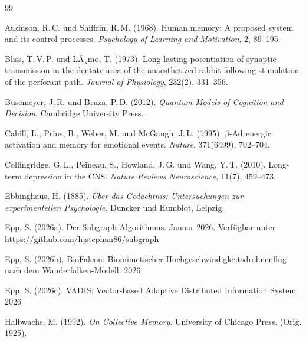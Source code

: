 ﻿\documentclass[12pt,a4paper,twoside]{article}
\theoremstyle{theormstyle}
\theoremstyle{proofstyle}
\begin{document}
	\begin{thebibliography}{99}
		
		Atkinson, R.\,C. und Shiffrin, R.\,M. (1968).
		Human memory: A proposed system and its control processes.
		\textit{Psychology of Learning and Motivation}, 2, 89--195.
		
		Bliss, T.\,V.\,P. und LÃ¸mo, T. (1973).
		Long-lasting potentiation of synaptic transmission in the
		dentate area of the anaesthetized rabbit following stimulation
		of the perforant path.
		\textit{Journal of Physiology}, 232(2), 331--356.
		
		Busemeyer, J.\,R. und Bruza, P.\,D. (2012).
		\textit{Quantum Models of Cognition and Decision}.
		Cambridge University Press.
		
		Cahill, L., Prins, B., Weber, M. und McGaugh, J.\,L. (1995).
		$\beta$-Adrenergic activation and memory for emotional events.
		\textit{Nature}, 371(6499), 702--704.
		
		Collingridge, G.\,L., Peineau, S., Howland, J.\,G. und Wang, Y.\,T. (2010).
		Long-term depression in the CNS.
		\textit{Nature Reviews Neuroscience}, 11(7), 459--473.
		
		Ebbinghaus, H. (1885).
		\textit{Über das Gedächtnis: Untersuchungen zur experimentellen Psychologie}.
		Duncker und Humblot, Leipzig.
		
		Epp, S. (2026a).
		Der Subgraph Algorithmus. Januar 2026. Verfügbar unter \url{https://github.com/hjstephan86/subgraph}
		
		Epp, S. (2026b).
		BioFalcon: Biomimetischer Hochgeschwindigkeitsdrohnenflug nach
		dem Wanderfalken-Modell. 2026
		
		Epp, S. (2026c).
		VADIS: Vector-based Adaptive Distributed Information System. 2026
		
		Halbwachs, M. (1992).
		\textit{On Collective Memory}.
		University of Chicago Press. (Orig. 1925).
		

\end{thebibliography}
\end{document}
